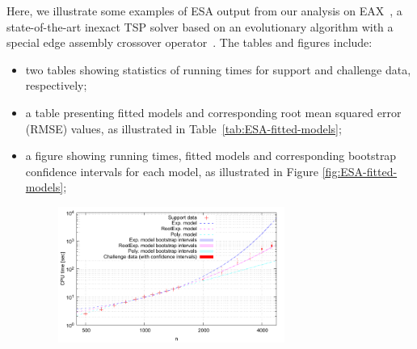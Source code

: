 \documentclass[aic]{iosart2x}
\begin{document}
\label{sec:ESA-Output}

 Here, we illustrate some examples of ESA output from our analysis on EAX~\cite{NagKob13}, a state-of-the-art inexact TSP solver based on an evolutionary algorithm with a special edge assembly crossover operator~\cite{Nag97}. The tables and figures include:
\begin{itemize}
\item two tables showing statistics of running times for support and challenge
data, respectively;
\item a table presenting fitted models and corresponding root mean squared error (RMSE) values, as illustrated
in Table~\ref{tab:ESA-fitted-models};
\begin{table}[t]
\caption{Fitted models example} \label{tab:ESA-fitted-models}
\begin{centering}
\medskip{}
\par
\end{centering}
\end{table}

\item a figure showing running times, fitted models and corresponding bootstrap
confidence intervals for each model, as illustrated in Figure \ref{fig:ESA-fitted-models};
\begin{figure}[t]
\noindent \begin{centering}
\includegraphics[width=0.7\textwidth]{EAX_fittedModels} \vspace{-5mm}


\end{centering}
\end{figure}
\end{itemize}
\end{document}

